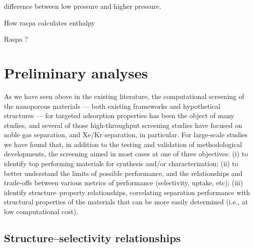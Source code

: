 \documentclass[main.tex]{subfiles}
\begin{document}
difference between low pressure and higher pressure.

 How raspa calculates enthalpy


Raspa ?

\section{Preliminary analyses}

As we have seen above in the existing literature, the computational screening of the nanoporous materials --- both existing frameworks and hypothetical structures --- for targeted adsorption properties has been the object of many studies, and several of those high-throughput screening studies have focused on noble gas separation, and Xe/Kr separation, in particular. For large-scale studies we have found that, in addition to the testing and validation of methodological developments, the screening aimed in most cases at one of three objectives: (i) to identify top performing materials for synthesis and/or characterization; (ii) to better understand the limits of possible performance, and the relationships and trade-offs between various metrics of performance (selectivity, uptake, etc); (iii) identify structure--property relationships, correlating separation performance with structural properties of the materials that can be more easily determined (i.e., at low computational cost).

\subsection{Structure--selectivity relationships}



\end{document}
